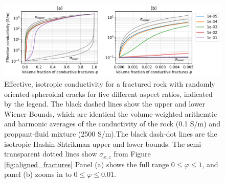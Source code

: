 \begin{figure}
    \begin{center}
    \includegraphics[width=\columnwidth]{figures/phys_prop_model/random_fractures.png}
    \end{center}
\caption{
    Effective, isotropic conductivity for a fractured rock with randomly oriented spheroidal
    cracks for five different aspect ratios, indicated by the legend. The black dashed lines show the upper and lower
    Wiener Bounds, which are identical the volume-weighted arithemtic and harmonic averages of the
    conductivity of the rock (0.1 S/m) and proppant-fluid mixture (2500 S/m).The black dash-dot lines
    are the isotropic Hashin-Shtrikman upper and lower bounds.
    The semi-transparent dotted lines show $\sigma_{x, z}$ from Figure \ref{fig:aligned_fractures}
    Panel (a) shows the
    full range $0 \leq \varphi \leq 1$, and panel (b) zooms in to $0 \leq \varphi \leq 0.01$.
}
\label{fig:random_fractures}
\end{figure}
